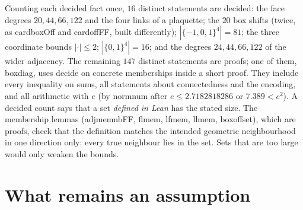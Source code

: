 \documentclass[11pt,a4paper]{article}
\theoremstyle{definition}
\theoremstyle{remark}
\DeclareRobustCommand{\lean}[1]{{\ttfamily\renewcommand{\_}{\textunderscore\allowbreak}#1}}
\begin{document}
Counting each decided fact once, $16$ distinct statements are decided: the face degrees $20,44,66,122$ and the four links of a plaquette; the $20$ box shifts (twice, as \lean{card\_boxOff} and \lean{card\_offFF}, built differently); $|\{-1,0,1\}^4|=81$; the three coordinate bounds $|\cdot|\le2$; $|\{0,1\}^4|=16$; and the degrees $24,44,66,122$ of the wider adjacency. The remaining $147$ distinct statements are proofs; one of them, \lean{box\_diag}, uses \lean{decide} on concrete memberships inside a short proof. They include every inequality on sums, all statements about connectedness and the encoding, and all arithmetic with $e$ (by \lean{norm\_num} after $e\le2.7182818286$ or $7.389<e^2$). A decided count says that a set \emph{defined in Lean} has the stated size. The membership lemmas (\lean{adj\_mem\_nbFF}, \lean{fl\_mem}, \lean{lf\_mem}, \lean{ll\_mem}, \lean{box\_offset}), which are proofs, check that the definition matches the intended geometric neighbourhood in one direction only: every true neighbour lies in the set. Sets that are too large would only weaken the bounds.

\section{What remains an assumption}\label{sec:assumptions}
\end{document}
